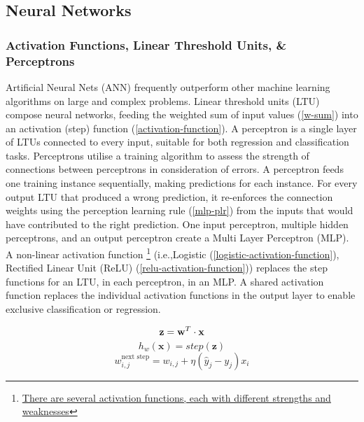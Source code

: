 \documentclass[12pt]{article}
\begin{document}
\subsection{Neural Networks} \label{nn-architecture}
\subsubsection{Activation Functions, Linear Threshold Units, \& Perceptrons}\label{mlp-math}
Artificial Neural Nets (ANN) frequently outperform other machine learning algorithms on large and complex problems.
Linear threshold units (LTU) compose neural networks, feeding the weighted sum of input values (\ref{w-sum}) into an activation (step) function (\ref{activation-function}).
A perceptron is a single layer of LTUs connected to every input, suitable for both regression and classification tasks.
Perceptrons utilise a training algorithm to assess the strength of connections between perceptrons in consideration of errors.
A perceptron feeds one training instance sequentially, making predictions for each instance.
For every output LTU that produced a wrong prediction, it re-enforces the connection weights using the perception learning rule (\ref{mlp-plr}) from the inputs that would have contributed to the right prediction.
One input perceptron, multiple hidden perceptrons, and an output perceptron create a Multi Layer Perceptron (MLP).
A non-linear activation function \footnote{\href{https://towardsdatascience.com/7-popular-activation-functions-you-should-know-in-deep-learning-and-how-to-use-them-with-keras-and-27b4d838dfe6}{There are several activation functions, each with different strengths and weaknesses}} (i.e.,Logistic (\ref{logistic-activation-function}), Rectified Linear Unit (ReLU) (\ref{relu-activation-function})) replaces the step functions for an LTU, in each perceptron, in an MLP.
A shared activation function replaces the individual activation functions in the output layer to enable exclusive classification or regression.
\begin{multicols}{3}
	\noindent
	\begin{equation}
		\textbf{z} =\textbf{w}^{T} \cdot \textbf{x}\\
		\label{w-sum}
	\end{equation}
	\begin{equation}
		h_{w}(\textbf{x})=step(\textbf{z})
		\label{activation-function}
	\end{equation}
	\begin{equation}
		w_{i,j}^{\text{next step}} = w_{i,j} + \eta (\hat{y}_j - y_j)x_i
		\label{mlp-plr}
	\end{equation}
\end{multicols}
\end{document}
